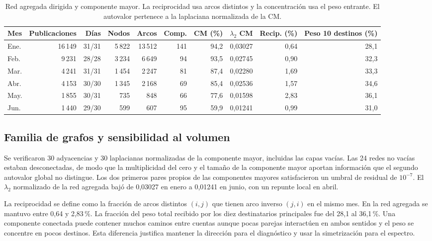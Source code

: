 \documentclass[journal]{IEEEtran}
\begin{document}
\begin{table}[t]
\centering
\caption{Red agregada dirigida y componente mayor. La reciprocidad usa arcos distintos y la concentración usa el peso entrante. El autovalor pertenece a la laplaciana normalizada de la CM.}
\label{tab:estructura}
\begin{tabular}{lrrrrrrrrr}
\toprule
Mes & Publicaciones & Días & Nodos & Arcos & Comp. & CM (\%) & $\lambda_2$ CM & Recip. (\%) & Peso 10 destinos (\%)\\
\midrule
Ene. & 16\,149 & 31/31 & 5\,822 & 13\,512 & 141 & 94,2 & 0,03027 & 0,64 & 28,1\\
Feb. & 9\,231 & 28/28 & 3\,234 & 6\,649 & 94 & 93,5 & 0,02745 & 0,90 & 32,3\\
Mar. & 4\,241 & 31/31 & 1\,454 & 2\,247 & 81 & 87,4 & 0,02280 & 1,69 & 33,3\\
Abr. & 4\,153 & 30/30 & 1\,345 & 2\,168 & 69 & 85,4 & 0,02536 & 1,57 & 34,6\\
May. & 1\,855 & 30/31 & 735 & 848 & 66 & 77,6 & 0,01598 & 2,83 & 36,1\\
Jun. & 1\,440 & 29/30 & 599 & 607 & 95 & 59,9 & 0,01241 & 0,99 & 31,0\\
\bottomrule
\end{tabular}
\end{table}

\subsection{Familia de grafos y sensibilidad al volumen}
Se verificaron 30 adyacencias y 30 laplacianas normalizadas de la componente mayor, incluidas las capas vacías. Las 24 redes no vacías estaban desconectadas, de modo que la multiplicidad del cero y el tamaño de la componente mayor aportan información que el segundo autovalor global no distingue. Los dos primeros pares propios de las componentes mayores satisfacieron un umbral de residual de $10^{-7}$. El $\lambda_2$ normalizado de la red agregada bajó de 0,03027 en enero a 0,01241 en junio, con un repunte local en abril.

La reciprocidad se define como la fracción de arcos distintos $(i,j)$ que tienen arco inverso $(j,i)$ en el mismo mes. En la red agregada se mantuvo entre 0,64 y 2,83\,\%. La fracción del peso total recibido por los diez destinatarios principales fue del 28,1 al 36,1\,\%. Una componente conectada puede contener muchos caminos entre cuentas aunque pocas parejas interactúen en ambos sentidos y el peso se concentre en pocos destinos. Esta diferencia justifica mantener la dirección para el diagnóstico y usar la simetrización para el espectro.
\end{document}
